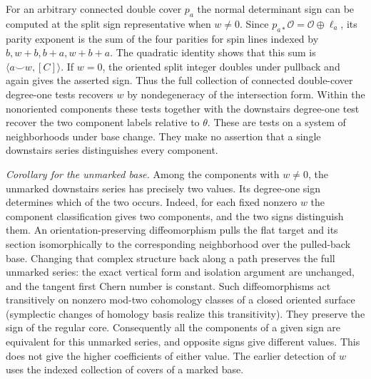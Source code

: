 For an arbitrary connected double cover \(p_a\) the normal determinant sign can be computed at the split sign representative when \(w\ne0\). Since \(p_{a*}\mathcal O=\mathcal O\oplus\ell_a\), its parity exponent is the sum of the four parities for spin lines indexed by \(b,w+b,b+a,w+b+a\). The quadratic identity shows that this sum is \(\langle a\smile w,[C]\rangle\). If \(w=0\), the oriented split integer doubles under pullback and again gives the asserted sign. Thus the full collection of connected double-cover degree-one tests recovers \(w\) by nondegeneracy of the intersection form. Within the nonoriented components these tests together with the downstairs degree-one test recover the two component labels relative to \(\theta\). These are tests on a system of neighborhoods under base change. They make no assertion that a single downstairs series distinguishes every component.

\emph{Corollary for the unmarked base.} Among the components with \(w\ne0\), the unmarked downstairs series has precisely two values. Its degree-one sign determines which of the two occurs. Indeed, for each fixed nonzero \(w\) the component classification gives two components, and the two signs distinguish them. An orientation-preserving diffeomorphism pulls the flat target and its section isomorphically to the corresponding neighborhood over the pulled-back base. Changing that complex structure back along a path preserves the full unmarked series: the exact vertical form and isolation argument are unchanged, and the tangent first Chern number is constant. Such diffeomorphisms act transitively on nonzero mod-two cohomology classes of a closed oriented surface (symplectic changes of homology basis realize this transitivity). They preserve the sign of the regular core. Consequently all the components of a given sign are equivalent for this unmarked series, and opposite signs give different values. This does not give the higher coefficients of either value. The earlier detection of \(w\) uses the indexed collection of covers of a marked base.
